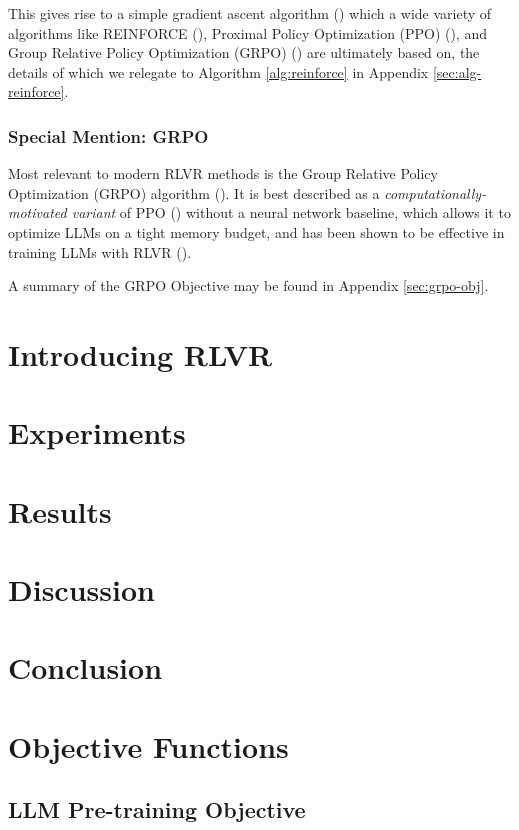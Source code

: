 \documentclass{article} %
\theoremstyle{definition}
\begin{document}
This gives rise to a simple gradient ascent algorithm (\cite{wk2}) which a wide variety of algorithms like
REINFORCE (\cite{Williams-1992}),
Proximal Policy Optimization (PPO) (\cite{ppo}),
and Group Relative Policy Optimization (GRPO) (\cite{grpo}) are ultimately based on,
the details of which we relegate to Algorithm \ref{alg:reinforce} in Appendix \ref{sec:alg-reinforce}.


\subsubsection{Special Mention: GRPO}
Most relevant to modern RLVR methods is the Group Relative Policy Optimization (GRPO) algorithm (\cite{grpo}).
It is best described as a \textit{computationally-motivated variant} of PPO (\cite{ppo}) without 
a neural network baseline, which allows it to optimize LLMs on a tight memory budget, and has
been shown to be effective in training LLMs with RLVR (\cite{grpo, r1}).

A summary of the GRPO Objective may be found in Appendix \ref{sec:grpo-obj}.

\section{Introducing RLVR} \label{sec:rlvr}

\section{Experiments}
\section{Results}
\section{Discussion}

\section{Conclusion}



\appendix
\section{Objective Functions}
\subsection{LLM Pre-training Objective}
\end{document}
